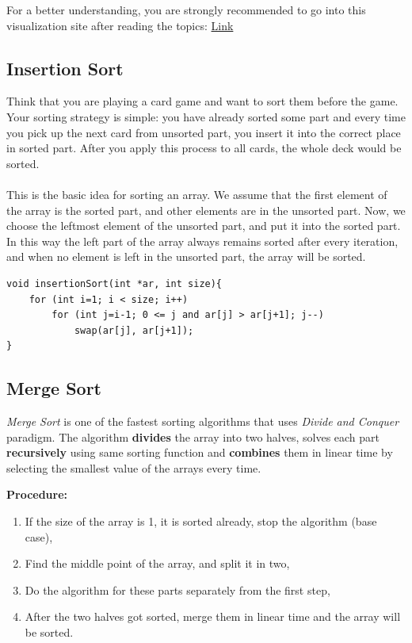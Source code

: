\documentclass[12pt]{article}
\begin{document}
	For a better understanding, you are strongly recommended to go into this visualization site after reading the topics: \href{https://visualgo.net/en/sorting}{Link}
	
		\subsection{Insertion Sort}
		
Think that you are playing a card game and want to sort them before the game. Your sorting strategy is simple: you have already sorted some part and every time you pick up the next card from unsorted part, you insert it into the correct place in sorted part. After you apply this process to all cards, the whole deck would be sorted. \\ \\
This is the basic idea for sorting an array. We assume that the first element of the array is the sorted part, and other elements are in the unsorted part. Now, we choose the leftmost element of the unsorted part, and put it into the sorted part. In this way the left part of the array always remains sorted after every iteration, and when no element is left in the unsorted part, the array will be sorted. 

	
\begin{verbatim}
void insertionSort(int *ar, int size){
    for (int i=1; i < size; i++)
        for (int j=i-1; 0 <= j and ar[j] > ar[j+1]; j--)
            swap(ar[j], ar[j+1]);
}
\end{verbatim}

\cleardoublepage

		\subsection{Merge Sort}

\textit{Merge Sort} is one of the fastest sorting algorithms that uses \textit{Divide and Conquer} paradigm. The algorithm \textbf{divides} the array into two halves, solves each part \textbf{recursively} using same sorting function and \textbf{combines} them in linear time by selecting the smallest value of the arrays every time.

\textbf{Procedure: }
\begin{enumerate}
	\item If the size of the array is 1, it is sorted already, stop the algorithm (base case),
	\item Find the middle point of the array, and split it in two,
	\item Do the algorithm for these parts separately from the first step,
	\item After the two halves got sorted, merge them in linear time and the array will be sorted. 
\end{enumerate}	
\end{document}
